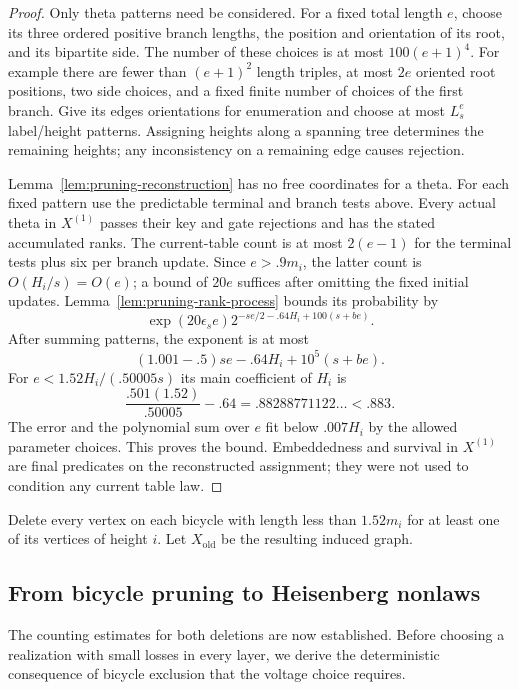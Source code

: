 \begin{proof}
Only theta patterns need be considered.  For a fixed total
length $e$, choose its three ordered positive branch lengths,
the position and orientation of its root, and its bipartite
side.  The number of these choices is at most $100(e+1)^4$.
For example there are fewer than $(e+1)^2$ length triples, at
most $2e$ oriented root positions, two side choices, and a
fixed finite number of choices of the first branch.  Give
its edges orientations for enumeration and choose at most
$L_s^e$ label/height patterns.  Assigning heights along a
spanning tree determines the remaining heights; any
inconsistency on a remaining edge causes rejection.

Lemma~\ref{lem:pruning-reconstruction} has no free coordinates
for a theta.  For each fixed pattern use the predictable
terminal and branch tests above.  Every actual theta in
$X^{(1)}$ passes their key and gate rejections and has the
stated accumulated ranks.  The current-table count is at
most $2(e-1)$ for the terminal tests plus six per branch
update.  Since $e>.9m_i$, the latter count is $O(H_i/s)=O(e)$;
a bound of $20e$ suffices after omitting the fixed initial
updates.  Lemma~\ref{lem:pruning-rank-process} bounds its
probability by
\[
 \exp(20\epsilon_s e)
 2^{-se/2-.64H_i+100(s+be)}.
\]
After summing patterns, the exponent is at most
\[
  (1.001-.5)se-.64H_i+10^5(s+be).
\]
For $e<1.52H_i/(.50005s)$ its main coefficient of $H_i$ is
\[
 \frac{.501(1.52)}{.50005}-.64
 =.88288771122\ldots<.883.
\]
The error and the polynomial sum over $e$ fit below $.007H_i$
by the allowed parameter choices.  This proves the bound.
Embeddedness and survival in $X^{(1)}$ are final predicates on
the reconstructed assignment; they were not used to
condition any current table law.
\end{proof}

Delete every vertex on each bicycle with length less than
$1.52m_i$ for at least one of its vertices of height $i$.
Let $X_{\mathrm{old}}$ be the resulting induced graph.

\subsection{From bicycle pruning to Heisenberg nonlaws}

The counting estimates for both deletions are now established.  Before
choosing a realization with small losses in every layer, we derive the
deterministic consequence of bicycle exclusion that the voltage choice
requires.

